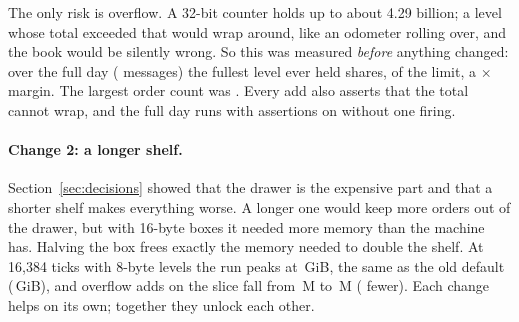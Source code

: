 \documentclass[10pt,a4paper]{article}
\begin{document}
The only risk is overflow. A 32-bit counter holds up to about 4.29 billion; a level whose total exceeded that would wrap around, like an odometer rolling over, and the book would be silently wrong.
So this was measured \emph{before} anything changed: over the full day (\LmMsgs{} messages) the fullest level ever held \LmShares{} shares, \LmPct{} of the limit, a \LmHeadroom$\times$ margin.
The largest order count was \LmOrders. Every add also asserts that the total cannot wrap, and the full day runs with assertions on without one firing.

\paragraph{Change 2: a longer shelf.} Section~\ref{sec:decisions} showed that the drawer is the expensive part and that a shorter shelf makes everything worse.
A longer one would keep more orders out of the drawer, but with 16-byte boxes it needed more memory than the machine has.
Halving the box frees exactly the memory needed to double the shelf. At 16{,}384 ticks with 8-byte levels the run peaks at \DfibwRss\,GiB, the same as the old default (\DfibRss\,GiB),
and overflow adds on the slice fall from \DfibOv\,M to \DfibwOv\,M (\PctOvWide{} fewer). Each change helps on its own; together they unlock each other.
\end{document}
